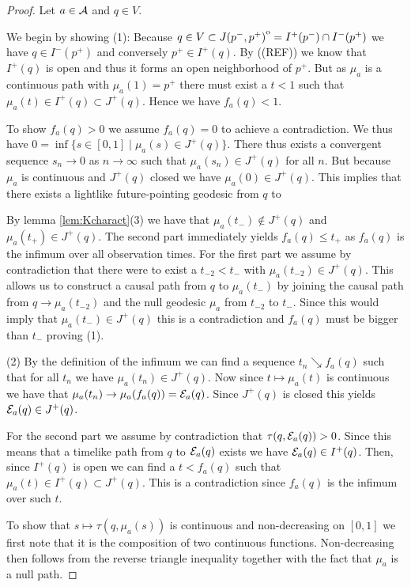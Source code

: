 \begin{proof}
Let $a\in \mathcal{A}$ and $q\in V$.

We begin by showing (1): 
Because $q\in V \subset {\kern0ptJ(p^-,p^+)}^{\mathrm{o}} = I^+(p^-)\cap I^-(p^+)$ we have $q\in I^-(p^+)$ and conversely $p^+\in I^+(q)$. By ((REF)) we know that $I^+(q)$ is open and thus it forms an open neighborhood of $p^+$. But as $\mu_a$ is a continuous path with $\mu_a(1)=p^+$ there must exist a $t<1$ such that $\mu_a(t)\in I^+(q)\subset J^+(q)$. Hence we have $f_a(q)<1$.

To show $f_a(q)>0$ we assume $f_a(q)=0$ to achieve a contradiction. We thus have $0=\inf \{s\in [0,1] \mid \mu_a(s)\in J^+(q)\}$. There thus exists a convergent sequence $s_n\to 0$ as $n\to \infty$ such that $\mu_a(s_n)\in J^+(q)$ for all $n$. But because $\mu_a$ is continuous and $J^+(q)$ closed we have $\mu_a(0)\in J^+(q)$. This implies that there exists a lightlike future-pointing geodesic from $q$ to  

\newpage
By lemma \ref{lem:Kcharact}(3) we have that
$\mu_a(t_-)\notin J^+(q)$ and $\mu_a(t_+)\in J^+(q)$. The second part immediately yields $f_a(q) \leq t_+$ as $f_a(q)$ is the infimum over all observation times. For the first part we assume by contradiction that there were to exist a $t_{-2}<t_-$ with $\mu_a(t_{-2})\in J^+(q)$. This allows us to construct a causal path from $q$ to $\mu_a(t_-)$ by joining the causal path from $q\to \mu_a(t_{-2})$ and the null geodesic $\mu_a$ from $t_{-2}$ to $t_-$. Since this would imply that $\mu_a(t_-)\in J^+(q)$ this is a contradiction and $f_a(q)$ must be bigger than $t_-$ proving (1).

(2)
By the definition of the infimum we can find a sequence $t_n\searrow f_a(q)$ such that for all $t_n$ we have $\mu_a(t_n)\in J^+(q)$. Now since $t\mapsto \mu_a(t)$ is continuous we have that $\mu_a(t_n)\to \mu_a(f_a(q)) = \mathcal{E}_a(q)$. Since $J^+(q)$ is closed this yields $\mathcal{E}_a(q)\in J^+(q)$. 

For the second part we assume by contradiction that $\tau(q,\mathcal{E}_a(q)) > 0$. Since this means that a timelike path from $q$ to $\mathcal{E}_a(q)$ exists we have $\mathcal{E}_a(q)\in I^+(q)$. Then, since $I^+(q)$ is open we can find a $t<f_a(q)$ such that $\mu_a(t)\in I^+(q) \subset J^+(q)$. This is a contradiction since $f_a(q)$ is the infimum over such $t$.

To show that $s\mapsto \tau(q,\mu_a(s))$ is continuous and non-decreasing on $[0,1]$ we first note that it is the composition of two continuous functions. Non-decreasing then follows from the reverse triangle inequality together with the fact that $\mu_a$ is a null path.


\end{proof}
